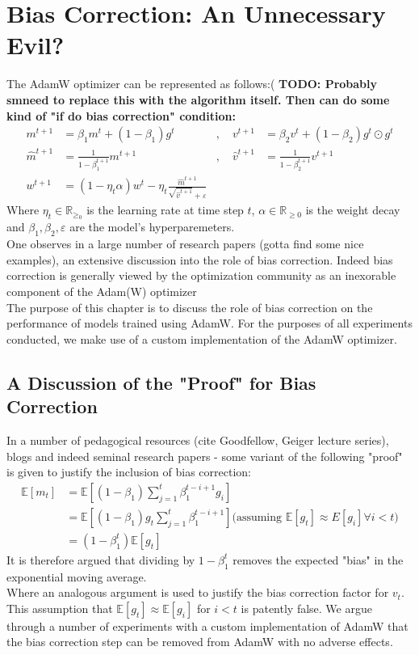 \documentclass[12pt]{book}
\newcommand{\R}{\mathbb{R}}
\newcommand{\E}{\mathbb{E}}
\newcommand{\todo}[1]{{\color{red}\bf{TODO: #1}}}
\begin{document}
\section{Bias Correction: An Unnecessary Evil? }
The AdamW optimizer can be represented as follows:( \todo{Probably smneed to replace this with the algorithm itself. Then can do some kind of "if do bias correction" condition:}
\begin{equation*}
\begin{aligned}
	m^{t+1} &= \beta_1 m^{t} + (1-\beta_1)g^{t}  &, \quad  v^{t+1} &= \beta_2 v^{t} + (1-\beta_2) g^{t} \odot g^{t}\\
	\hat{m}^{t+1} &= \frac{1}{1-\beta_1^{t+1}} m^{t+1}  &, \quad \hat{v}^{t+1} &= \frac{1}{1-\beta_2^{t+1}} v^{t+1}\\
	w^{t+1} &= (1-\eta_t\alpha)w^{t} - \eta_t \frac{\hat{m}^{t+1}}{\sqrt{\hat{v}^{t+1}} +\varepsilon }
\end{aligned}
\end{equation*}
Where $\eta_t\in\R_{\ge_0}$ is the learning rate at time step $t$, $\alpha\in \R_{\ge0}$ is the weight decay and $\beta_1, \beta_2, \varepsilon $ are the model's hyperparemeters. 
\\
One observes in a large number of research papers (gotta find some nice examples), an extensive discussion into the role of bias correction. 
Indeed bias correction is generally viewed by the optimization community as an inexorable component of the Adam(W) optimizer\\
The purpose of this chapter is to discuss the role of bias correction on the performance of models trained using AdamW. For the purposes of all experiments conducted, we make use of a custom implementation of the AdamW optimizer. 
\subsection{A Discussion of the "Proof" for Bias Correction}
In a number of pedagogical resources (cite Goodfellow, Geiger lecture series), blogs and indeed seminal research papers - some variant of the following "proof" is given to justify the inclusion of bias correction:
\begin{align*}
	\E[m_t] &= \E\left[ (1-\beta_1)\sum_{j=1}^{t} {\beta_1^{t-i+1} g_i}  \right]  \\
		&= \E\left[(1-\beta_1)g_t \sum_{j=1}^{t} {\beta_1^{t-i+1}}\right] (\text{assuming $\E[g_t] \approx E[g_i]\forall i<t$)}\\
		&= (1-\beta_1^{t})\E[g_t]
\end{align*}
It is therefore argued that dividing by  $1-\beta_1^{t}$ removes the expected "bias" in the exponential moving average.\\ 
Where an analogous argument is used to justify the bias correction factor for $v_t$. \\
This assumption that $\E[g_t] \approx \E[g_i]$ for $i<t$ is patently false. We argue through a number of experiments with a custom implementation of AdamW that the bias correction step can be removed from AdamW with no adverse effects.
\\
\end{document}
